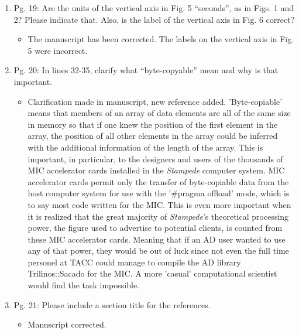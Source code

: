 \documentclass{article}
\begin{document}
\begin{enumerate}
    \item
        Pg. 19: Are the units of the vertical axis in Fig. 5 “seconds”, as in Figs. 1 and 2?
        Please indicate that. Also, is the label of the vertical axis in Fig. 6 correct?

{\color{red}  
\begin{itemize}
     \item
        The manuscript has been corrected. The labels on the vertical axis in Fig. 5 were incorrect. 
  \end{itemize}}

\item
Pg. 20: In lines 32-35, clarify what “byte-copyable” mean and why is that important.

{\color{red}  
\begin{itemize}
     \item
     Clarification made in manuscript, new reference added. 
     'Byte-copiable' means that members of an array of data elements are all of
     the same size in memory so that if one knew the position of the first
     element in the array, the position of all other elements in the array
     could be inferred with the additional information of the length of the
     array. This is important, in particular, to the designers and users of the
     thousands of MIC accelerator cards installed in the \emph{Stampede}
     computer system. MIC accelerator cards permit only the transfer of
     byte-copiable data from the host computer system for use with the '#pragma
     offload' mode, which is to say most code written for the MIC. This is even
     more important when it is realized that the great majority of
     \emph{Stampede}'s theoretical processing power, the figure used to advertise to potential clients, is counted from these MIC
     accelerator cards. Meaning that if an AD user wanted to use any of that
     power, they would be out of luck since not even the full time personel at
     TACC could manage to compile the AD library Trilinos::Sacado for the MIC.
     A more 'casual' computational scientist would find the task impossible.
  \end{itemize}}

 \item
    Pg. 21: Please include a section title for the references.

{\color{red}  
\begin{itemize}
     \item
         Manuscript corrected.
  \end{itemize}}


\end{enumerate}
\end{document}
